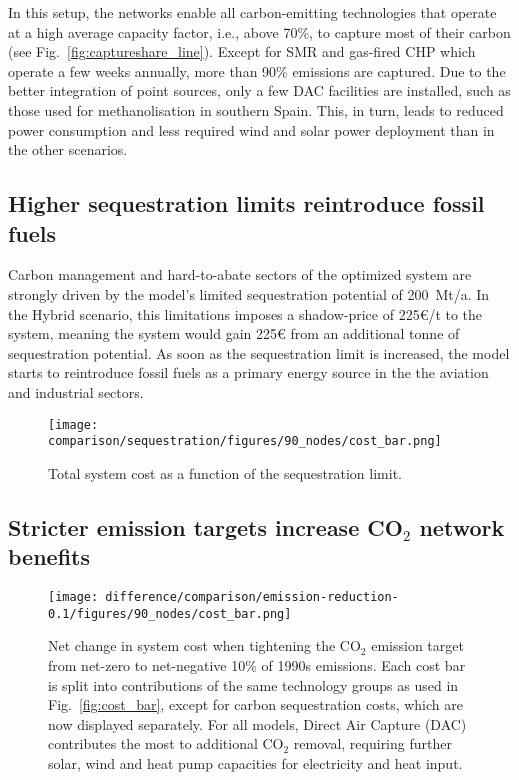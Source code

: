 \documentclass[twocolumn]{article}
\newcommand{\carbon}{CO$_2$}
\begin{document}
In this setup, the networks enable all carbon-emitting technologies that operate at a high average capacity factor, i.e., above 70\%, to capture most of their carbon (see Fig.~\ref{fig:captureshare_line}). Except for SMR and gas-fired CHP which operate a few weeks annually, more than 90\% emissions are captured.
Due to the better integration of point sources, only a few DAC facilities are installed, such as those used for methanolisation in southern Spain. This, in turn, leads to reduced power consumption and less required wind and solar power deployment than in the other scenarios.

\subsection*{Higher sequestration limits reintroduce fossil fuels}
\label{sec:higher_sequestration}
Carbon management and hard-to-abate sectors of the optimized system are strongly driven by the model's limited sequestration potential of 200~Mt/a. In the Hybrid scenario, this limitations imposes a shadow-price of 225€/t to the system, meaning the system would gain 225€ from an additional tonne of sequestration potential. As soon as the sequestration limit is increased, the model starts to reintroduce fossil fuels as a primary energy source in the the aviation and industrial sectors.


\begin{figure}[htb!]
    \centering
    \texttt{[image: comparison/sequestration/figures/90\_nodes/cost\_bar.png]}
    \caption[short]{Total system cost as a function of the sequestration limit.}
    \label{fig:sequestration_cost_bar}
\end{figure}


\subsection*{Stricter emission targets increase \carbon{} network benefits}
\begin{figure}[htb!]
    \centering
    \texttt{[image: difference/comparison/emission-reduction-0.1/figures/90\_nodes/cost\_bar.png]}
    \caption[short]{Net change in system cost when tightening the \carbon{} emission target from net-zero to net-negative 10\% of 1990s emissions. Each cost bar is split into contributions of the same technology groups as used in Fig.~\ref{fig:cost_bar}, except for carbon sequestration costs, which are now displayed separately. For all models, Direct Air Capture (DAC) contributes the most to additional \carbon{} removal, requiring further solar, wind and heat pump capacities for electricity and heat input.}
    \label{fig:net-negative_cost_bar}
\end{figure}
\end{document}

